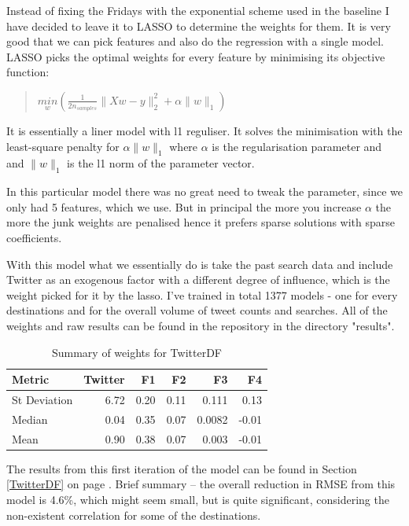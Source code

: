 \documentclass[minf,twoside,singlespacing,parskip,frontabs,notimes,11pt]{infthesis}
\begin{document}
Instead of fixing the Fridays with the exponential scheme used in the baseline I have decided to leave it to LASSO to determine the weights for them. It is very good that we can pick features and also do the regression with a single model. LASSO picks the optimal weights for every feature by minimising its objective function:
\begin{quotation}
\begin{center}
$\underset{w}{min}({\frac{1}{2n_{samples}}} \|Xw - y \|_2^2 + \alpha\|w\|_1) $
\end{center}
\end{quotation}
It is essentially a liner model with l1 reguliser. It solves the minimisation with the least-square penalty for $\alpha\|w\|_1$ where $\alpha$ is the regularisation parameter and and $\|w\|_1$ is the l1 norm of the parameter vector. 

In this particular model there was no great need to tweak the parameter, since we only had 5 features, which we use. But in principal the more you increase $\alpha$ the more the junk weights are penalised hence it prefers sparse solutions with sparse coefficients. 


With this model what we essentially do is take the past search data and include Twitter as an exogenous factor with a different degree of influence, which is the weight picked for it by the lasso. I've trained in total 1377 models - one for every destinations and for the overall volume of tweet counts and searches. All of the weights and raw results can be found in the repository in the directory "results".


\begin{table}[h]
\begin{center}
\begin{tabular}{ l | r | r | r | r | r}
\textbf{Metric} & \textbf{Twitter} & \textbf{F1} & \textbf{F2} & \textbf{F3} & \textbf{F4}\\
\hline
St Deviation & 6.72 & 0.20 & 0.11 & 0.111 & 0.13\\
Median & 0.04 & 0.35 & 0.07 & 0.0082 & -0.01\\
Mean & 0.90 & 0.38 & 0.07 & 0.003 & -0.01\\
\end{tabular}
\end{center}
\caption{Summary of weights for TwitterDF}
\end{table}

The results from this first iteration of the model can be found in Section \ref{TwitterDF} on page \pageref{TwitterDF}. Brief summary -- the overall reduction in RMSE from this model is 4.6\%, which might seem small, but is quite significant, considering the non-existent correlation for some of the destinations.
\end{document}
